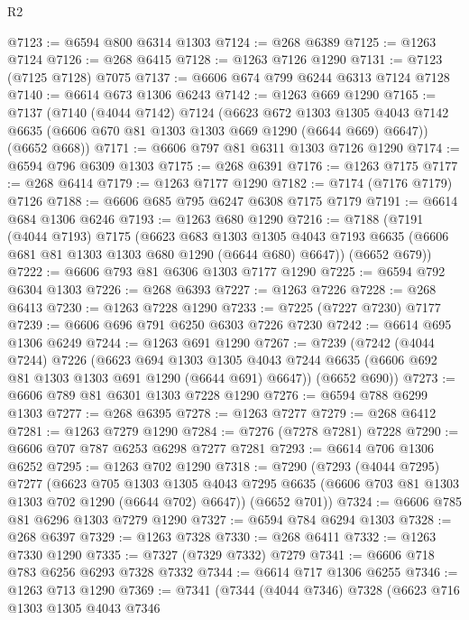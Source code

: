 \begin{lexlean}{R2}
\begin{coremodule}
@7123 := @6594 @800 @6314 @1303
@7124 := @268 @6389
@7125 := @1263 @7124
@7126 := @268 @6415
@7128 := @1263 @7126 @1290
@7131 := @7123 (@7125 @7128) @7075
@7137 := @6606 @674 @799 @6244 @6313 @7124 @7128
@7140 := @6614 @673 @1306 @6243
@7142 := @1263 @669 @1290
@7165 := @7137
    (@7140
      (@4044 @7142)
      @7124
      (@6623
        @672
        @1303
        @1305
        @4043
        @7142
        @6635
        (@6606 @670 @81 @1303 @1303 @669 @1290 (@6644 @669) @6647))
      (@6652 @668))
@7171 := @6606 @797 @81 @6311 @1303 @7126 @1290
@7174 := @6594 @796 @6309 @1303
@7175 := @268 @6391
@7176 := @1263 @7175
@7177 := @268 @6414
@7179 := @1263 @7177 @1290
@7182 := @7174 (@7176 @7179) @7126
@7188 := @6606 @685 @795 @6247 @6308 @7175 @7179
@7191 := @6614 @684 @1306 @6246
@7193 := @1263 @680 @1290
@7216 := @7188
    (@7191
      (@4044 @7193)
      @7175
      (@6623
        @683
        @1303
        @1305
        @4043
        @7193
        @6635
        (@6606 @681 @81 @1303 @1303 @680 @1290 (@6644 @680) @6647))
      (@6652 @679))
@7222 := @6606 @793 @81 @6306 @1303 @7177 @1290
@7225 := @6594 @792 @6304 @1303
@7226 := @268 @6393
@7227 := @1263 @7226
@7228 := @268 @6413
@7230 := @1263 @7228 @1290
@7233 := @7225 (@7227 @7230) @7177
@7239 := @6606 @696 @791 @6250 @6303 @7226 @7230
@7242 := @6614 @695 @1306 @6249
@7244 := @1263 @691 @1290
@7267 := @7239
    (@7242
      (@4044 @7244)
      @7226
      (@6623
        @694
        @1303
        @1305
        @4043
        @7244
        @6635
        (@6606 @692 @81 @1303 @1303 @691 @1290 (@6644 @691) @6647))
      (@6652 @690))
@7273 := @6606 @789 @81 @6301 @1303 @7228 @1290
@7276 := @6594 @788 @6299 @1303
@7277 := @268 @6395
@7278 := @1263 @7277
@7279 := @268 @6412
@7281 := @1263 @7279 @1290
@7284 := @7276 (@7278 @7281) @7228
@7290 := @6606 @707 @787 @6253 @6298 @7277 @7281
@7293 := @6614 @706 @1306 @6252
@7295 := @1263 @702 @1290
@7318 := @7290
    (@7293
      (@4044 @7295)
      @7277
      (@6623
        @705
        @1303
        @1305
        @4043
        @7295
        @6635
        (@6606 @703 @81 @1303 @1303 @702 @1290 (@6644 @702) @6647))
      (@6652 @701))
@7324 := @6606 @785 @81 @6296 @1303 @7279 @1290
@7327 := @6594 @784 @6294 @1303
@7328 := @268 @6397
@7329 := @1263 @7328
@7330 := @268 @6411
@7332 := @1263 @7330 @1290
@7335 := @7327 (@7329 @7332) @7279
@7341 := @6606 @718 @783 @6256 @6293 @7328 @7332
@7344 := @6614 @717 @1306 @6255
@7346 := @1263 @713 @1290
@7369 := @7341
    (@7344
      (@4044 @7346)
      @7328
      (@6623
        @716
        @1303
        @1305
        @4043
        @7346

\end{coremodule}
\end{lexlean}
